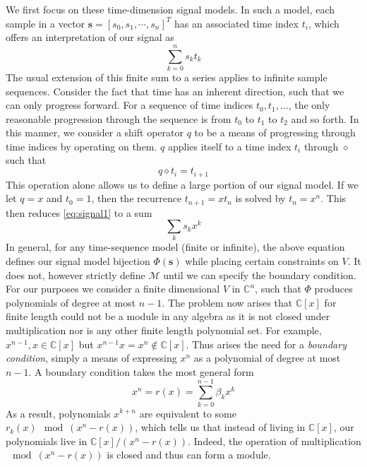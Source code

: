 \documentclass[12pt,technote]{IEEEtran}
\begin{document}
We first focus on these time-dimension signal models. In such a model, each sample in a vector $\mathbf{s} = [s_0, s_1, \cdots, s_n]^T$ has an associated time index $t_i$, which offers an interpretation of our signal as
\begin{equation}
    \sum_{k=0}^ns_kt_k\label{eq:signal1}
\end{equation}
The usual extension of this finite sum to a series applies to infinite sample sequences. Consider the fact that time has an inherent direction, such that we can only progress forward. For a sequence of time indices $t_0, t_1, \dots$, the only reasonable progression through the sequence is from $t_0$ to $t_1$ to $t_2$ and so forth. In this manner, we consider a shift operator $q$ to be a means of progressing through time indices by operating on them. $q$ applies itself to a time index $t_i$ through $\diamond$ such that 
\begin{equation*}
    q\diamond t_i = t_{i+1} 
\end{equation*}
This operation alone allows us to define a large portion of our signal model. If we let $q = x$ and $t_0 = 1$, then the recurrence $t_{n+1} = xt_n$ is solved by $t_n = x^n$. This then reduces \eqref{eq:signal1} to a sum
\begin{equation*}
    \sum_{k}s_kx^k
\end{equation*}
In general, for any time-sequence model (finite or infinite), the above equation defines our signal model bijection $\Phi(\mathbf{s})$ while placing certain constraints on $V$. It does not, however strictly define $\mathcal{M}$ until we can specify the boundary condition. For our purposes we consider a finite dimensional $V$ in $\mathbb{C}^n$, such that $\Phi$ produces polynomials of degree at most $n-1$. The problem now arises that $\mathbb{C}[x]$ for finite length could not be a module in any algebra as it is not closed under multiplication nor is any other finite length polynomial set. For example, $x^{n-1},x\in \mathbb{C}[x]$ but $x^{n-1}x = x^n\not\in \mathbb{C}[x]$. Thus arises the need for a \textit{boundary condition}, simply a means of expressing $x^n$ as a polynomial of degree at most $n-1$. A boundary condition takes the most general form
\begin{equation}
    x^n = r(x) = \sum_{k=0}^{n-1}\beta_kx^k
\end{equation}
As a result, polynomials $x^{k+n}$ are equivalent to some $r_k(x)\mod{(x^n-r(x))}$, which tells us that instead of living in $\mathbb{C}[x]$, our polynomials live in $\mathbb{C}[x]/(x^n-r(x))$. Indeed, the operation of multiplication $\mod{(x^n-r(x))}$ is closed and thus can form a module.
\end{document}
